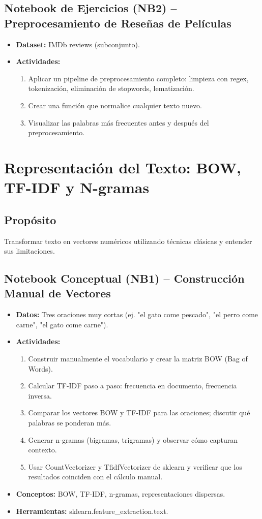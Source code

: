 \documentclass[12pt,a4paper]{article}
\begin{document}
\subsection*{Notebook de Ejercicios (NB2) – Preprocesamiento de Reseñas de Películas}
\begin{itemize}
    \item \textbf{Dataset:} IMDb reviews (subconjunto).
    \item \textbf{Actividades:}
    \begin{enumerate}
        \item Aplicar un pipeline de preprocesamiento completo: limpieza con regex, tokenización, eliminación de stopwords, lematización.
        \item Crear una función que normalice cualquier texto nuevo.
        \item Visualizar las palabras más frecuentes antes y después del preprocesamiento.
    \end{enumerate}
\end{itemize}

\section{Representación del Texto: BOW, TF-IDF y N-gramas}
\subsection*{Propósito}
Transformar texto en vectores numéricos utilizando técnicas clásicas y entender sus limitaciones.

\subsection*{Notebook Conceptual (NB1) – Construcción Manual de Vectores}
\begin{itemize}
    \item \textbf{Datos:} Tres oraciones muy cortas (ej. "el gato come pescado", "el perro come carne", "el gato come carne").
    \item \textbf{Actividades:}
    \begin{enumerate}
        \item Construir manualmente el vocabulario y crear la matriz BOW (Bag of Words).
        \item Calcular TF-IDF paso a paso: frecuencia en documento, frecuencia inversa.
        \item Comparar los vectores BOW y TF-IDF para las oraciones; discutir qué palabras se ponderan más.
        \item Generar n-gramas (bigramas, trigramas) y observar cómo capturan contexto.
        \item Usar CountVectorizer y TfidfVectorizer de sklearn y verificar que los resultados coinciden con el cálculo manual.
    \end{enumerate}
    \item \textbf{Conceptos:} BOW, TF-IDF, n-gramas, representaciones dispersas.
    \item \textbf{Herramientas:} sklearn.feature\_extraction.text.
\end{itemize}
\end{document}
